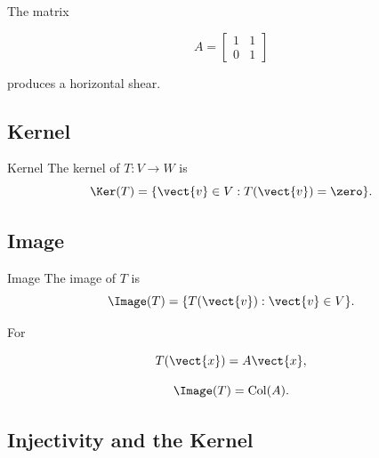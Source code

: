 The matrix

\[ A=\begin{bmatrix}1&1\\0&1\end{bmatrix} \]

produces a horizontal shear.

\begin{center}
\end{center}

\subsection{Kernel}
\label{subsec:kernel-linear-transformation}

\begin{definitionbox}{Kernel}
The kernel of \(T:V\to W\) is
\[ \Ker(T)=\{\vect{v}\in V:T(\vect{v})=\zero\}. \]
\end{definitionbox}

\subsection{Image}
\label{subsec:image-linear-transformation}

\begin{definitionbox}{Image}
The image of \(T\) is
\[ \Image(T)=\{T(\vect{v}):\vect{v}\in V\}. \]
\end{definitionbox}

For

\[ T(\vect{x})=A\vect{x}, \]

\[ \Image(T)=\operatorname{Col}(A). \]

\subsection{Injectivity and the Kernel}
\label{subsec:injectivity-kernel}

